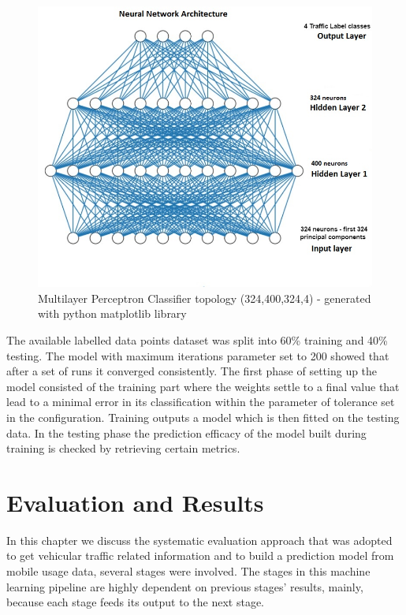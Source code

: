 \documentclass[12pt, a4paper]{report}
\theoremstyle{definition}
\theoremstyle{definition}%
\theoremstyle{definition}%
\theoremstyle{definition}%
\theoremstyle{definition}%
\theoremstyle{definition}%
\begin{document}
\begin{figure}[!]	
	\includegraphics[scale=0.70]{ann_topology.jpg}
	\centering
	\caption[Multilayer Perceptron Classifier topology]{Multilayer Perceptron Classifier topology (324,400,324,4) - generated with python matplotlib library }
	\label{fig:ann_topology}
\end{figure}
 

The available labelled data points dataset was split into 60\% training and 40\% testing. The model with maximum iterations parameter set to 200 showed that after a set of runs it converged consistently. The first phase of setting up the model consisted of the training part where the weights settle to a final value that lead to a minimal error in its classification within the parameter of tolerance set in the configuration. Training outputs a model which is then fitted on the testing data. In the testing phase the prediction efficacy of the model built during training is checked by retrieving certain metrics.





\chapter{Evaluation and Results} \label{chapter:evaluation_and_results}

In this chapter we discuss the systematic evaluation approach that was adopted to get vehicular traffic related information and to build a prediction model from mobile usage data, several stages were involved. The stages in this machine learning pipeline are highly dependent on previous stages' results, mainly, because each stage feeds its output to the next stage. 
\end{document}
